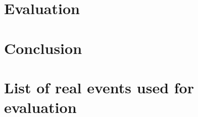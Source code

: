 \documentclass[12pt,twoside]{report}
\begin{document}
\chapter{Evaluation}


\chapter{Conclusion}



\appendix
\chapter{List of real events used for evaluation}
\label{app:real-events}




\end{document}
